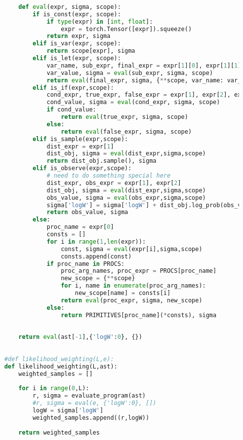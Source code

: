 \documentclass[12pt]{article}%
\theoremstyle{definition}
\begin{document}
\begin{lstlisting}[language=Python]
	
	    def eval(expr, sigma, scope):
	        if is_const(expr, scope):
	            if type(expr) in [int, float]:
	                expr = torch.Tensor([expr]).squeeze()
	            return expr, sigma
	        elif is_var(expr, scope):
	            return scope[expr], sigma
	        elif is_let(expr, scope):
	            var_name, sub_expr, final_expr = expr[1][0], expr[1][1], expr[2]
	            var_value, sigma = eval(sub_expr, sigma, scope)
	            return eval(final_expr, sigma, {**scope, var_name: var_value})
	        elif is_if(expr,scope):
	            cond_expr, true_expr, false_expr = expr[1], expr[2], expr[3]
	            cond_value, sigma = eval(cond_expr, sigma, scope)
	            if cond_value:
	                return eval(true_expr, sigma, scope)
	            else:
	                return eval(false_expr, sigma, scope)
	        elif is_sample(expr,scope):
	            dist_expr = expr[1]
	            dist_obj, sigma = eval(dist_expr,sigma,scope)
	            return dist_obj.sample(), sigma
	        elif is_observe(expr,scope):
	            # need to do something special here
	            dist_expr, obs_expr = expr[1], expr[2]
	            dist_obj, sigma = eval(dist_expr,sigma,scope)
	            obs_value, sigma = eval(obs_expr,sigma,scope)
	            sigma['logW'] = sigma['logW'] + dist_obj.log_prob(obs_value)
	            return obs_value, sigma
	        else:
	            proc_name = expr[0]
	            consts = []
	            for i in range(1,len(expr)):
	                const, sigma = eval(expr[i],sigma,scope)
	                consts.append(const)
	            if proc_name in PROCS:
	                proc_arg_names, proc_expr = PROCS[proc_name]
	                new_scope = {**scope}
	                for i, name in enumerate(proc_arg_names):
	                    new_scope[name] = consts[i]
	                return eval(proc_expr, sigma, new_scope)
	            else:
	                return PRIMITIVES[proc_name](*consts), sigma
	
	
	    return eval(ast[-1],{'logW':0}, {})
	
	
	#def likelihood_weighting(L,e):
	def likelihood_weighting(L,ast):
	    weighted_samples = []
	
	    for i in range(0,L):
	        r, sigma = evaluate_program(ast)
	        #r, sigma = eval(e, {'logW':0}, [])
	        logW = sigma['logW']
	        weighted_samples.append((r,logW))
	        
	    return weighted_samples
	\end{lstlisting}	
	
\end{document}
